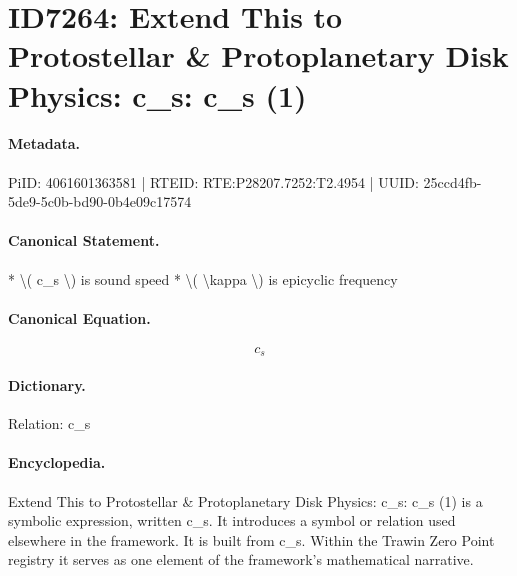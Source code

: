 \section*{ID7264: Extend This to Protostellar \& Protoplanetary Disk Physics: c\_s: c\_s (1)}
\paragraph{Metadata.}
PiID: 4061601363581 | RTEID: RTE:P28207.7252:T2.4954 | UUID: 25ccd4fb-5de9-5c0b-bd90-0b4e09c17574

\paragraph{Canonical Statement.}
* \textbackslash{}( c\_s \textbackslash{}) is sound speed * \textbackslash{}( \textbackslash{}kappa \textbackslash{}) is epicyclic frequency

\paragraph{Canonical Equation.}
\[
c_s
\]

\paragraph{Dictionary.}
Relation: c\_s

\paragraph{Encyclopedia.}
Extend This to Protostellar \& Protoplanetary Disk Physics: c\_s: c\_s (1) is a symbolic expression, written c\_s. It introduces a symbol or relation used elsewhere in the framework. It is built from c\_s. Within the Trawin Zero Point registry it serves as one element of the framework's mathematical narrative.
